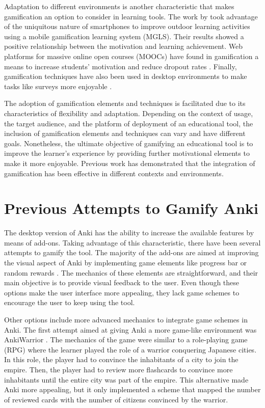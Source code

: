 Adaptation to different environments is another characteristic that makes gamification an option to consider in learning tools. The work by \citep{su2015mobile} took advantage of the uniquitous nature of smartphones to improve outdoor learning activities using a mobile gamification learning system (MGLS). Their results showed a positive relationship between the motivation and learning achievement. Web platforms for massive online open courses (MOOCs) have found in gamification a means to increase students' motivation and reduce dropout rates \citep{gene2014gamification}. Finally, gamification techniques have also been used in desktop environments to make tasks like surveys more enjoyable \citep{cheong2013quick}.

The adoption of gamification elements and techniques is facilitated due to its characteristics of flexibility and adaptation. Depending on the context of usage, the target audience, and the platform of deployment of an educational tool, the inclusion of gamification elements and techniques can vary and have different goals. Nonetheless, the ultimate objective of gamifying an educational tool is to improve the learner's experience by providing further motivational elements to make it more enjoyable. Previous work has demonstrated that the integration of gamification has been effective in different contexts and environments.

\section{Previous Attempts to Gamify Anki}
The desktop version of Anki has the ability to increase the available features by means of add-ons. Taking advantage of this characteristic, there have been several attempts to gamify the tool. The majority of the add-ons are aimed at improving the visual aspect of Anki by implementing game elements like progress bar \citep{glut2017progress} or random rewards \citep{glut2017puppy}. The mechanics of these elements are straightforward, and their main objective is to provide visual feedback to the user. Even though these options make the user interface more appealing, they lack game schemes to encourage the user to keep using the tool.

Other options include more advanced mechanics to integrate game schemes in Anki. The first attempt aimed at giving Anki a more game-like environment was AnkiWarrior \citep{proxx2010warrior}. The mechanics of the game were similar to a role-playing game (RPG) where the learner played the role of a warrior conquering Japanese cities. In this role, the player had to convince the inhabitants of a city to join the empire. Then, the player had to review more flashcards to convince more inhabitants until the entire city was part of the empire. This alternative made Anki more appealing, but it only implemented a scheme that mapped the number of reviewed cards with the number of citizens convinced by the warrior.

